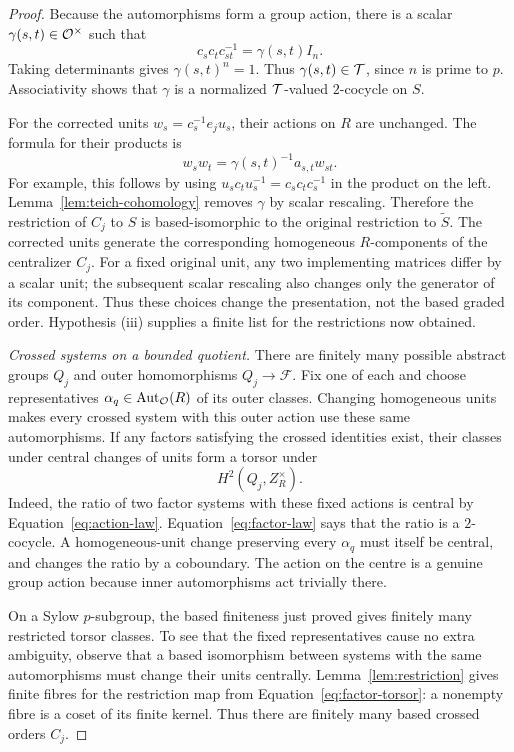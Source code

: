 \begin{proof}
Because the automorphisms form a group action, there is a
scalar $\gamma(s,t)\in\mathcal O^\times$ such that
\[
 c_sc_tc_{st}^{-1}=\gamma(s,t)I_n.
\]
Taking determinants gives $\gamma(s,t)^n=1$.  Thus
$\gamma(s,t)\in\mathcal T$, since $n$ is prime to $p$.
Associativity shows that $\gamma$ is a normalized
$\mathcal T$-valued $2$-cocycle on $S$.

For the corrected units $w_s=c_s^{-1}e_ju_s$, their
actions on $R$ are unchanged.  The formula for their
products is
\begin{equation}\label{eq:corrected-matrix-factors}
 w_sw_t=\gamma(s,t)^{-1}a_{s,t}w_{st}.
\end{equation}
For example, this follows by using
$u_sc_tu_s^{-1}=c_sc_tc_s^{-1}$ in the product on the
left.  Lemma~\ref{lem:teich-cohomology} removes $\gamma$
by scalar rescaling.  Therefore the restriction of $C_j$
to $S$ is based-isomorphic to the original restriction to
$\widetilde S$.  The corrected units generate the corresponding
homogeneous $R$-components of the centralizer $C_j$.  For a fixed
original unit, any two implementing matrices differ by a scalar
unit; the subsequent scalar rescaling also changes only the
generator of its component.  Thus these choices change the
presentation, not the based graded order.  Hypothesis (iii) supplies a finite list
for the restrictions now obtained.

\emph{Crossed systems on a bounded quotient.}
There are finitely many possible abstract groups $Q_j$
and outer homomorphisms $Q_j\to\mathcal F$.  Fix one of
each and choose representatives
$\alpha_q\in\operatorname{Aut}_{\mathcal O}(R)$ of its outer classes.
Changing homogeneous units makes every crossed system
with this outer action use these same automorphisms.
If any factors satisfying the crossed identities exist,
their classes under central changes of units form a
torsor under
\begin{equation}\label{eq:factor-torsor}
 H^2(Q_j,Z_R^\times).
\end{equation}
Indeed, the ratio of two factor systems with these fixed
actions is central by Equation~\eqref{eq:action-law}.
Equation~\eqref{eq:factor-law} says that the ratio is a
$2$-cocycle.  A homogeneous-unit change preserving every
$\alpha_q$ must itself be central, and changes the ratio
by a coboundary.  The action on the centre is a genuine
group action because inner automorphisms act trivially
there.

On a Sylow $p$-subgroup, the based finiteness just proved
gives finitely many restricted torsor classes.  To see
that the fixed representatives cause no extra ambiguity,
observe that a based isomorphism between systems with
the same automorphisms must change their units centrally.
Lemma~\ref{lem:restriction} gives finite fibres for the
restriction map from Equation~\eqref{eq:factor-torsor}: a nonempty
fibre is a coset of its finite kernel.
Thus there are finitely many based crossed orders $C_j$.


\end{proof}

